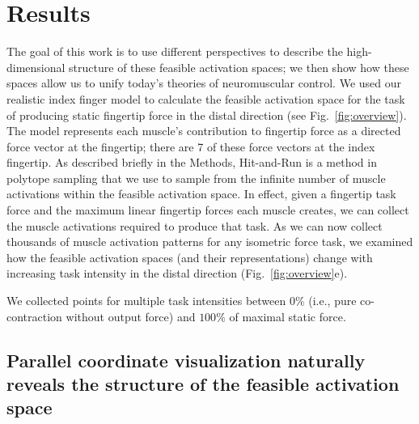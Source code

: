 \documentclass[9pt,twocolumn,twoside,lineno]{pnas-new}
\begin{document}
\section*{Results}

The goal of this work is to use different perspectives to describe the high-dimensional structure of these feasible activation spaces; we then show how these spaces allow us to unify today’s theories of neuromuscular control. We used our realistic index finger model to calculate the feasible activation space for the task of producing static fingertip force in the distal direction (see Fig.~\ref{fig:overview}). The model represents each muscle's contribution to fingertip force as a directed force vector at the fingertip; there are 7 of these force vectors at the index fingertip.
As described briefly in the Methods, Hit-and-Run is a method in polytope sampling that we use to sample from the infinite number of muscle activations within the feasible activation space. In effect, given a fingertip task force and the maximum linear fingertip forces each muscle creates, we can collect the muscle activations required to produce that task. As we can now collect thousands of muscle activation patterns for any isometric force task, we examined how the feasible activation spaces (and their representations) change with increasing task intensity in the distal direction (Fig.~\ref{fig:overview}e).

We collected points for multiple task intensities between $0\%$ (i.e., pure co-contraction without output force) and $100\%$ of maximal static force.


\subsection*{Parallel coordinate visualization naturally reveals the structure of the feasible activation space}
\end{document}
